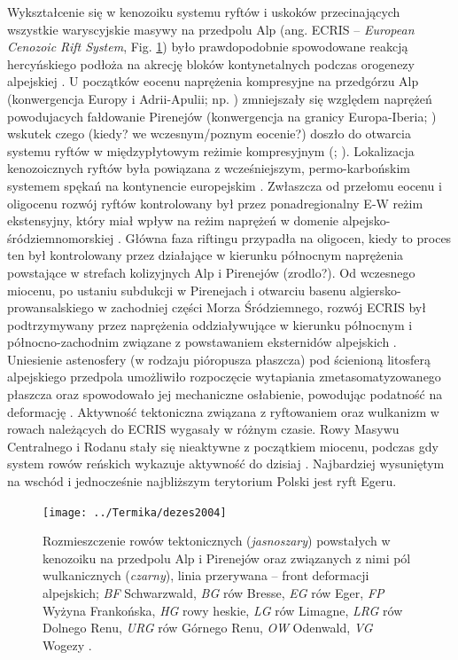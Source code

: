 \documentclass[11.5pt,twoside]{report}
\begin{document}
	
Wykształcenie się w kenozoiku systemu ryftów i uskoków przecinających wszystkie waryscyjskie masywy na przedpolu Alp (ang. ECRIS -- \textit{European Cenozoic Rift System}, Fig. \ref{dezes}) było prawdopodobnie spowodowane reakcją hercyńskiego podłoża na akrecję bloków kontynetalnych podczas orogenezy alpejskiej \parencite{Ulrych.2002}. U początków eocenu naprężenia kompresyjne na przedgórzu Alp (konwergencja Europy i Adrii-Apulii; np. \cite{Sissingh.2006a}) zmniejszały się względem naprężeń powodujacych fałdowanie Pirenejów (konwergencja na granicy Europa-Iberia; \cite{Rosenbaum.2002}) wskutek czego (kiedy? we wczesnym/poznym eocenie?) doszło do otwarcia systemu ryftów w międzypłytowym reżimie kompresyjnym (\cite{Ziegler.2007}; \cite{Dezes.2004}). Lokalizacja kenozoicznych ryftów była powiązana z wcześniejszym, permo-karbońskim systemem spękań na kontynencie europejskim \parencite{Wilson.2006,Sissingh.2006a}. Zwłaszcza od przełomu eocenu i oligocenu rozwój ryftów kontrolowany był przez ponadregionalny E-W reżim ekstensyjny, który miał wpływ na reżim naprężeń w domenie alpejsko-śródziemnomorskiej \parencite{Sissingh.2006a}. Główna faza riftingu przypadła na oligocen, kiedy to proces ten był kontrolowany przez działające w kierunku północnym naprężenia powstające w strefach kolizyjnych Alp i Pirenejów (zrodlo?). Od wczesnego miocenu, po ustaniu subdukcji w Pirenejach i otwarciu basenu algiersko-prowansalskiego w zachodniej części Morza Śródziemnego, rozwój ECRIS był podtrzymywany przez naprężenia oddziaływujące w kierunku północnym i północno-zachodnim związane z powstawaniem eksternidów alpejskich \parencite{Dezes.2004}. Uniesienie astenosfery (w rodzaju pióropusza płaszcza) pod ścienioną litosferą alpejskiego przedpola umożliwiło rozpoczęcie wytapiania zmetasomatyzowanego płaszcza \parencite{Ulrych.2002} oraz spowodowało jej mechaniczne osłabienie, powodując podatność na deformację \parencite{Dezes.2004}. Aktywność tektoniczna związana z ryftowaniem oraz wulkanizm w rowach należących do ECRIS wygasały w różnym czasie. Rowy Masywu Centralnego i Rodanu stały się nieaktywne z początkiem miocenu, podczas gdy system rowów reńskich wykazuje aktywność do dzisiaj \parencite{Dezes.2004}. Najbardziej wysuniętym na wschód i jednocześnie najbliższym terytorium Polski jest ryft Egeru.


\begin{figure}[h]
	\centering
	\texttt{[image: ../Termika/dezes2004]}
	\caption{Rozmieszczenie rowów tektonicznych (\textit{jasnoszary}) powstałych w kenozoiku na przedpolu Alp i Pirenejów oraz związanych z nimi pól wulkanicznych (\textit{czarny}), linia przerywana -- front deformacji alpejskich; \textit{BF} Schwarzwald, \textit{BG} rów Bresse, \textit{EG} rów Eger, \textit{FP} Wyżyna Frankońska, \textit{HG} rowy heskie, \textit{LG} rów Limagne, \textit{LRG} rów Dolnego Renu, \textit{URG} rów Górnego Renu, \textit{OW} Odenwald, \textit{VG} Wogezy \parencite{Dezes.2004}.}
\label{dezes}
\end{figure}
\end{document}
